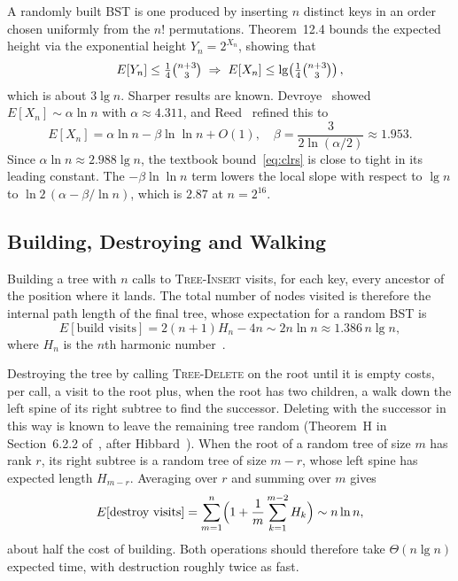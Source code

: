 \documentclass[conference]{IEEEtran}
\newcommand{\INS}{\textsc{Tree-Insert}}
\newcommand{\DEL}{\textsc{Tree-Delete}}
\begin{document}
A randomly built BST is one produced by inserting $n$ distinct keys in an
order chosen uniformly from the $n!$ permutations. Theorem~12.4 bounds the
expected height via the exponential height $Y_n = 2^{X_n}$, showing that
\begin{equation}
E[Y_n] \le \tfrac{1}{4}\tbinom{n+3}{3}
\;\Rightarrow\;
E[X_n] \le \lg\!\left(\tfrac{1}{4}\tbinom{n+3}{3}\right),
\label{eq:clrs}
\end{equation}
which is about $3\lg n$. Sharper results are known. Devroye~\cite{devroye} showed
$E[X_n] \sim \alpha \ln n$ with $\alpha \approx 4.311$, and Reed~\cite{reed}
refined this to
\begin{equation}
E[X_n] = \alpha\ln n - \beta\ln\ln n + O(1),
\quad \beta = \frac{3}{2\ln(\alpha/2)} \approx 1.953.
\label{eq:reed}
\end{equation}
Since $\alpha\ln n \approx 2.988\lg n$, the textbook bound~\eqref{eq:clrs} is
close to tight in its leading constant. The $-\beta\ln\ln n$ term lowers the
local slope with respect to $\lg n$ to
$\ln 2\,(\alpha - \beta/\ln n)$, which is $2.87$ at $n = 2^{16}$.

\subsection{Building, Destroying and Walking}

Building a tree with $n$ calls to \INS{} visits, for each key, every ancestor
of the position where it lands. The total number of nodes visited is
therefore the internal path length of the final tree, whose expectation for a
random BST is
\begin{equation}
E[\text{build visits}] = 2(n+1)H_n - 4n \sim 2n\ln n \approx 1.386\,n\lg n,
\label{eq:build}
\end{equation}
where $H_n$ is the $n$th harmonic number~\cite{knuth}.

Destroying the tree by calling \DEL{} on the root until it is empty costs, per
call, a visit to the root plus, when the root has two children, a walk down
the left spine of its right subtree to find the successor. Deleting with the
successor in this way is known to leave the remaining tree random
(Theorem~H in Section~6.2.2 of~\cite{knuth}, after Hibbard~\cite{hibbard}).
When the root of a random tree of size $m$ has rank $r$, its right subtree is a
random tree of size $m-r$, whose left spine has expected length $H_{m-r}$.
Averaging over $r$ and summing over $m$ gives
\begin{equation}
E[\text{destroy visits}] = \sum_{m=1}^{n}\Bigl(1 + \frac{1}{m}\sum_{k=1}^{m-2}H_k\Bigr) \sim n\ln n,
\label{eq:destroy}
\end{equation}
about half the cost of building. Both operations should therefore take
$\Theta(n\lg n)$ expected time, with destruction roughly twice as fast.
\end{document}
